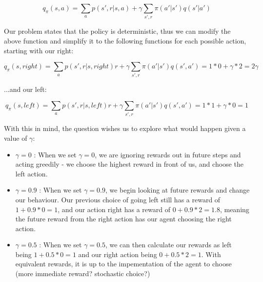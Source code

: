 \documentclass{article}
\begin{document}
\begin{equation}
    q_\pi(s,a) = \sum_a p(s',r|s,a)+\gamma \sum_{s',r} \pi(a'|s')q(s'|a')
\end{equation}

\noindent Our problem states that the policy is deterministic, thus we can modify the above function and simplify it to the following functions for each possible action, starting with our right:

\begin{equation}
    q_\pi(s,right) = \sum_a p(s',r|s,right)r + \gamma \sum_{s',r} \pi(a'|s')q(s',a') = 1 * 0 + \gamma * 2 = 2\gamma
\end{equation}

\noindent ...and our left:

\begin{equation}
    q_\pi(s,left) = \sum_a p(s',r|s,left)r + \gamma \sum_{s',r} \pi(a'|s')q(s',a') = 1 * 1 + \gamma * 0 = 1
\end{equation}

With this in mind, the question wishes us to explore what would happen given a value of $\gamma$:

\begin{itemize}
    \item \textbf{$\gamma=0$} : When we set $\gamma=0$, we are ignoring rewards out in future steps and acting greedily - we choose the highest reward in front of us, and choose the left action.
    \item \textbf{$\gamma=0.9$} : When we set $\gamma=0.9$, we begin looking at future rewards and change our behaviour. Our previous choice of going left still has a reward of $1 + 0.9 * 0 = 1$, and our action right has a reward of $0 + 0.9*2 = 1.8$, meaning the future reward from the right action has our agent choosing the right action.
    \item \textbf{$\gamma=0.5$} : When we set $\gamma=0.5$, we can then calculate our rewards as left being $1 + 0.5 * 0 = 1$ and our right action being $0 + 0.5*2 = 1$. With equivalent rewards, it is up to the impementation of the agent to choose (more immediate reward? stochastic choice?)
\end{itemize}
\end{document}
